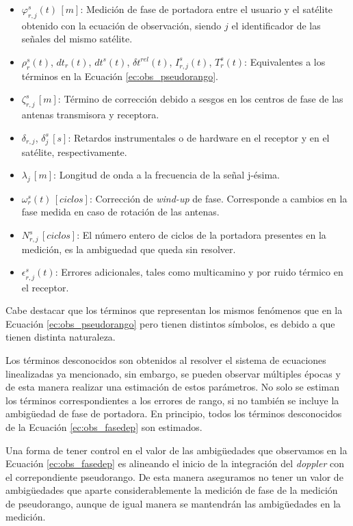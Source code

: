 \documentclass[a4paper,12pt,oneside,onecolumn,final,openright]{book}%
\begin{document}
\begin{itemize}
	\item $\varphi _{r,j}^s(t)\,[m]$: Medición de fase de portadora entre el usuario y el satélite obtenido con la ecuación de observación, siendo $j$ el identificador de las señales del mismo satélite.
	\item $\rho_r^s(t)$, $dt_r(t)$, $dt^s(t)$, $\delta t^{rel}(t)$, $I_{r,j}^s(t)$, $T_r^s(t)$: Equivalentes a los términos en la Ecuación \eqref{ec:obs_pseudorango}.
	\item $\zeta_{r,j}^s\,[m]$: Término de corrección debido a sesgos en los centros de fase de las antenas transmisora y receptora.
	\item $\delta_{r,j}$, $\delta_j^s\,[s]$: Retardos instrumentales o de hardware en el receptor y en el satélite, respectivamente.
	\item $\lambda_j\,[m]$: Longitud de onda a la frecuencia de la señal j-ésima.
	\item $\omega_r^s(t)\,[ciclos]$: Corrección de \textit{wind-up} de fase. Corresponde a cambios en la fase medida en caso de rotación de las antenas.
	\item $N_{r,j}^s\,[ciclos]$: El número entero de ciclos de la portadora presentes en la medición, es la ambiguedad que queda sin resolver.
	\item $\epsilon_{r,j}^s(t)$: Errores adicionales, tales como multicamino y por ruido térmico en el receptor.
\end{itemize}
Cabe destacar que los términos que representan los mismos fenómenos que en la Ecuación \eqref{ec:obs_pseudorango} pero tienen distintos símbolos, es debido a que tienen distinta naturaleza. 

	Los términos desconocidos son obtenidos al resolver el sistema de ecuaciones linealizadas ya mencionado, sin embargo, se pueden observar múltiples épocas y de esta manera realizar una estimación de estos parámetros. No solo se estiman los términos correspondientes a los errores de rango, si no también se incluye la ambigüedad de fase de portadora. En principio, todos los términos desconocidos de la Ecuación \eqref{ec:obs_fasedep} son estimados.
	
	Una forma de tener control en el valor de las ambigüedades que observamos en la Ecuación \eqref{ec:obs_fasedep} es alineando el inicio de la integración del \textit{doppler} con el correpondiente pseudorango. De esta manera aseguramos no tener un valor de ambigüedades que aparte considerablemente la medición de fase de la medición de pseudorango, aunque de igual manera se mantendrán las ambigüedades en la medición.
\end{document}
